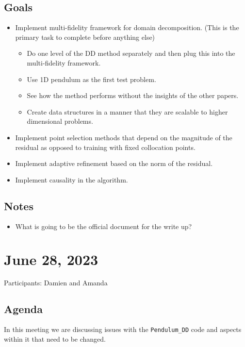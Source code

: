 \documentclass{article}
\begin{document}
\subsection*{Goals}
\begin{itemize}
\item Implement multi-fidelity framework for domain decomposition. (This is the primary task to complete before anything else)
\begin{itemize}
	\item Do one level of the DD method separately and then plug this into the multi-fidelity framework.
	\item Use 1D pendulum as the first test problem.
	\item See how the method performs without the insights of the other papers.
	\item Create data structures in a manner that they are scalable to higher dimensional problems.
\end{itemize}
\item Implement point selection methods that depend on the magnitude of the residual as opposed to training with fixed collocation points.
\item Implement adaptive refinement based on the norm of the residual.
\item Implement causality in the algorithm.
\end{itemize}
\subsection*{Notes}
\begin{itemize}
	\item What is going to be the official document for the write up?
\end{itemize}
\newpage
\section*{June 28, 2023}
Participants: Damien and Amanda
\subsection*{Agenda}
In this meeting we are discussing issues with the \verb|Pendulum_DD| code and aspects within it that need to be changed.
\end{document}

